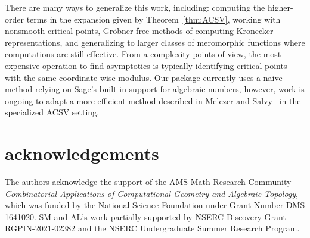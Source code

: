 \documentclass[a4paper]{amsart}
\theoremstyle{definition}
\begin{document}
There are many ways to generalize this work, including: computing the higher-order terms in the expansion given by Theorem~\ref{thm:ACSV}, working with nonsmooth critical points, Gröbner-free methods of computing Kronecker representations, and generalizing to larger classes of meromorphic functions where computations are still effective. From a complexity points of view, the most expensive operation to find asymptotics is typically identifying critical points with the same coordinate-wise modulus. Our package currently uses a naive method relying on Sage's built-in support for algebraic numbers, however, work is ongoing to adapt a more efficient method described in Melczer and Salvy~\cite{MelczerSalvy2021} in the specialized ACSV setting.

\section{acknowledgements}
The authors acknowledge the support of the AMS Math Research Community \emph{Combinatorial Applications of Computational Geometry and Algebraic Topology}, which was funded by the National Science Foundation under Grant Number DMS 1641020. SM and AL's work partially supported by NSERC Discovery Grant RGPIN-2021-02382 and the NSERC Undergraduate Summer Research Program.

\printbibliography
\end{document}

